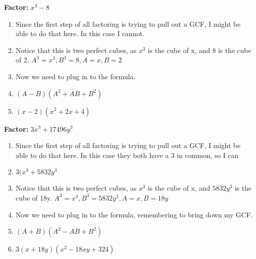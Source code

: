 \documentclass{article}
\begin{document}
\textbf{Factor:} $x^{3} - 8$\\
\begin{enumerate}
\item Since the first step of all factoring is trying to pull out a GCF, I might be able to do that here. In this case I cannot.
\item Notice that this is two perfect cubes, as $x^{3}$ is the cube of x, and 8 is the cube of 2. $A^{3}=x^{3}, B^{3}=8, A=x, B=2$
\item Now we need to plug in to the formula.
\item [] $(A-B)(A^{2}+AB+B^{2})$
\item [] $(x-2)(x^{2}+2x+4)$
\end{enumerate}
\textbf{Factor:} $3x^{3} + 17496y^{3}$\\
\begin{enumerate}
\item Since the first step of all factoring is trying to pull out a GCF, I might be able to do that here. In this case they both have a 3 in common, so I can
\item [] $3(x^{3}+5832y^{3}$
\item Notice that this is two perfect cubes, as $x^{3}$ is the cube of x, and $5832y^{3}$ is the cube of 18y. $A^{3}=x^{3}, B^{3}=5832y^{3}, A=x, B=18y$
\item Now we need to plug in to the formula, remembering to bring down my GCF.
\item [] $(A+B)(A^{2}-AB+B^{2})$
\item [] $3(x+18y)(x^{2}-18xy+324)$
\end{enumerate}

\newpage
\end{document}
